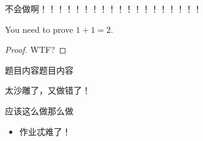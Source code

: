 \begin{solution}
	不会做啊！！！！！！！！！！！！！！！！！！！
\end{solution}
\begin{problem}[书本：题目]
	You need to prove $1+1=2$.
\end{problem}

%

\begin{proof}
	WTF?
\end{proof}


\begincorrection
\begin{problem}[书本：题目]
	题目内容题目内容
\end{problem}

\begin{cause}
	太沙雕了，又做错了！
\end{cause}

\begin{revision}
	应该这么做那么做
\end{revision}





\beginfb
\begin{itemize}
	\item 作业忒难了！
\end{itemize}






